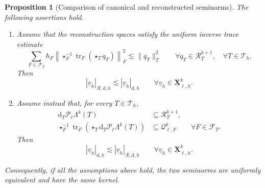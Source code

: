 \documentclass[a4paper,11pt]{article}
\newtheorem{proposition}[theorem]{Proposition}
\theoremstyle{definition}
\newcommand{\DIFF}{\mathrm{d}}
\newcommand{\PL}[2]{\mathcal{P}_{#1}\Lambda^{#2}}
\newcommand{\uXh}[1]{\underline{\boldsymbol{X}}_{\ell,h}^{#1}}
\newcommand{\Qtrace}[2]{\mathcal Q_{\ell,#1}^{#2}}
\newcommand{\trc}{\operatorname{tr}}
\begin{document}
\begin{proposition}[Comparison of canonical and reconstructed seminorms]
\label{prop:comparison.broken.reconstructed.energies}
The following assertions hold.

\begin{enumerate}

\item Assume that the reconstruction spaces satisfy the uniform inverse trace estimate
\begin{equation}\label{eq:reconstruction.inverse.trace}
  \sum_{F\in\mathcal F_T}
  h_F
  \left\|
    \star_F^{-1}
    \trc_F(\star_Tq_T)
  \right\|_F^2
  \lesssim
  \|q_T\|_T^2
  \qquad
  \forall q_T\in\mathcal R_T^{k+1},
  \quad
  \forall T\in\mathcal T_h.
\end{equation}
Then
\begin{equation}\label{eq:reconstructed.energy.controlled.by.broken}
  |\underline v_h|_{\mathcal R,\DIFF,h}
  \lesssim
  |\underline v_h|_{\DIFF,h}
  \qquad
  \forall\underline v_h\in\uXh{k}.
\end{equation}

\item Assume instead that, for every $T\in\mathcal T_h$,
\begin{align}
  \DIFF_T\PL{\ell}{k}(T)
  &\subseteq
  \mathcal R_T^{k+1},
  \label{eq:energy.reverse.cell.inclusion}
  \\
  \star_F^{-1}
  \trc_F
  \left(
    \star_T\DIFF_T\PL{\ell}{k}(T)
  \right)
  &\subseteq
  \Qtrace{F}{k}
  \qquad
  \forall F\in\mathcal F_T.
  \label{eq:energy.reverse.face.inclusion}
\end{align}
Then
\begin{equation}\label{eq:broken.energy.controlled.by.reconstructed}
  |\underline v_h|_{\DIFF,h}
  \lesssim
  |\underline v_h|_{\mathcal R,\DIFF,h}
  \qquad
  \forall\underline v_h\in\uXh{k}.
\end{equation}

\end{enumerate}

Consequently, if all the assumptions above hold, the two seminorms are uniformly equivalent and have the same kernel.
\end{proposition}
\end{document}
